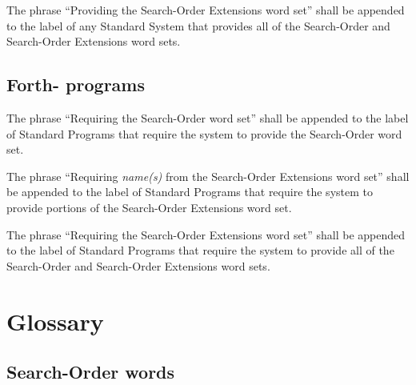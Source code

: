 The phrase ``Providing the Search-Order Extensions word set'' shall
be appended to the label of any Standard System that provides all of
the Search-Order and Search-Order Extensions word sets.

\subsection{Forth-\snapshot{} programs} %

The phrase ``Requiring the Search-Order word set'' shall be appended
to the label of Standard Programs that require the system to provide
the Search-Order word set.

The phrase ``Requiring \emph{name(s)} from the Search-Order
Extensions word set'' shall be appended to the label of Standard
Programs that require the system to provide portions of the
Search-Order Extensions word set.

The phrase ``Requiring the Search-Order Extensions word set'' shall
be appended to the label of Standard Programs that require the system
to provide all of the Search-Order and Search-Order Extensions word
sets.


\section{Glossary} %
\vspace{1ex}

\subsection{Search-Order words} %
\vspace{1ex}

